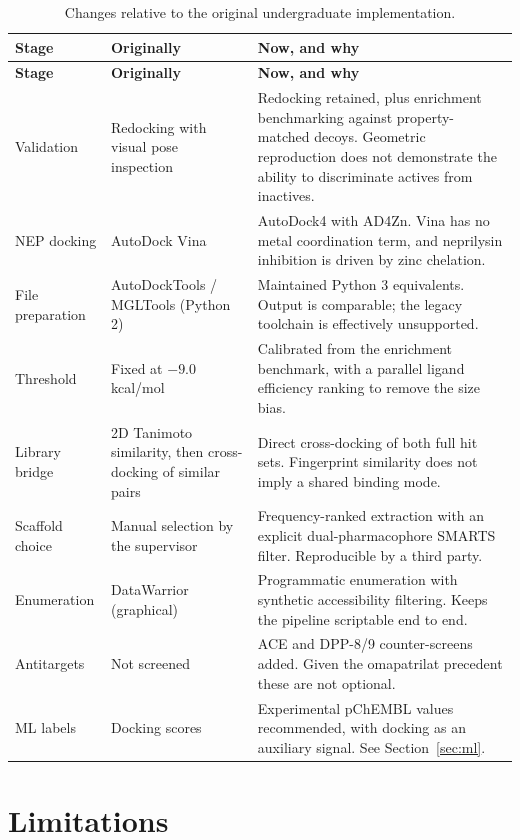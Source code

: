 \documentclass[11pt,a4paper]{article}
\begin{document}
\begin{longtable}{p{2.5cm}p{4.3cm}p{7.6cm}}
\caption{Changes relative to the original undergraduate implementation.}\\
\toprule
\textbf{Stage} & \textbf{Originally} & \textbf{Now, and why} \\
\midrule
\endfirsthead
\toprule
\textbf{Stage} & \textbf{Originally} & \textbf{Now, and why} \\
\midrule
\endhead
Validation & Redocking with visual pose inspection & Redocking retained, plus
enrichment benchmarking against property-matched decoys. Geometric
reproduction does not demonstrate the ability to discriminate actives from
inactives. \\
\addlinespace
NEP docking & AutoDock Vina & AutoDock4 with AD4Zn. Vina has no metal
coordination term, and neprilysin inhibition is driven by zinc chelation. \\
\addlinespace
File preparation & AutoDockTools / MGLTools (Python 2) & Maintained Python 3
equivalents. Output is comparable; the legacy toolchain is effectively
unsupported. \\
\addlinespace
Threshold & Fixed at $-9.0$ kcal/mol & Calibrated from the enrichment
benchmark, with a parallel ligand efficiency ranking to remove the size bias. \\
\addlinespace
Library bridge & 2D Tanimoto similarity, then cross-docking of similar pairs &
Direct cross-docking of both full hit sets. Fingerprint similarity does not
imply a shared binding mode. \\
\addlinespace
Scaffold choice & Manual selection by the supervisor & Frequency-ranked
extraction with an explicit dual-pharmacophore SMARTS filter. Reproducible by a
third party. \\
\addlinespace
Enumeration & DataWarrior (graphical) & Programmatic enumeration with synthetic
accessibility filtering. Keeps the pipeline scriptable end to end. \\
\addlinespace
Antitargets & Not screened & ACE and DPP-8/9 counter-screens added. Given the
omapatrilat precedent these are not optional. \\
\addlinespace
ML labels & Docking scores & Experimental pChEMBL values recommended, with
docking as an auxiliary signal. See Section~\ref{sec:ml}. \\
\bottomrule
\end{longtable}

\section{Limitations}
\end{document}

